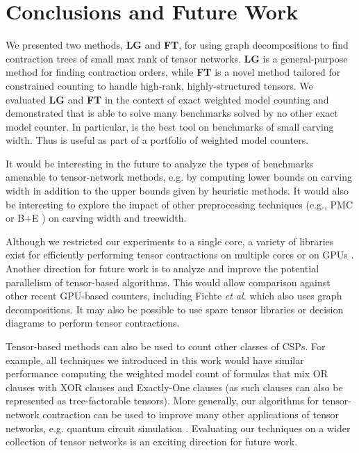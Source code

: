 \section{Conclusions and Future Work} \label{sec:conclusion}
We presented two methods, \textbf{LG} and \textbf{FT}, for using graph decompositions to find contraction trees of small max rank of tensor networks. \textbf{LG} is a general-purpose method for finding contraction orders, while \textbf{FT} is a novel method tailored for constrained counting to handle high-rank, highly-structured tensors. We evaluated \textbf{LG} and \textbf{FT} in the context of exact weighted model counting and demonstrated that  is able to solve many benchmarks solved by no other exact model counter. In particular,  is the best tool on benchmarks of small carving width. Thus  is useful as part of a portfolio of weighted model counters. 

It would be interesting in the future to analyze the types of benchmarks amenable to tensor-network methods, e.g. by computing lower bounds on carving width in addition to the upper bounds given by heuristic methods. It would also be interesting to explore the impact of other preprocessing techniques (e.g., PMC \cite{LM14} or B+E \cite{LLM16}) on carving width and treewidth.

Although we restricted our experiments to a single core, a variety of libraries exist for efficiently performing tensor contractions on multiple cores or on GPUs \cite{KSTKPPRS19,NRBHHJN15}. Another direction for future work is to analyze and improve the potential parallelism of tensor-based algorithms. This would allow comparison against other recent GPU-based counters, including Fichte \emph{et al.}  which also uses graph decompositions. It may also be possible to use spare tensor libraries \cite{FWS20} or decision diagrams \cite{BFGHMPS97} to perform tensor contractions.

Tensor-based methods can also be used to count other classes of CSPs. For example, all techniques we introduced in this work would have similar performance computing the weighted model count of formulas that mix OR clauses with XOR clauses and Exactly-One clauses (as such clauses can also be represented as tree-factorable tensors). More generally, our algorithms for tensor-network contraction can be used to improve many other applications of tensor networks, e.g. quantum circuit simulation \cite{MS08}. Evaluating our techniques on a wider collection of tensor networks is an exciting direction for future work. %





